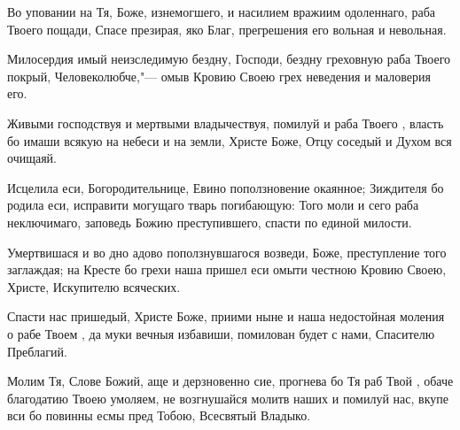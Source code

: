 \begin{mymulticols}





Во уповании на Тя, Боже, изнемогшего, и насилием вражиим одоленнаго, раба Твоего пощади, Спасе презирая, яко Благ, прегрешения его вольная и невольная.




Милосердия имый неизследимую бездну, Господи, бездну греховную раба Твоего покрый, Человеколюбче,"--- омыв Кровию Своею грех неведения и маловерия его.


\slava


Живыми господствуя и мертвыми владычествуя, помилуй и раба Твоего , власть бо имаши всякую на небеси и на земли, Христе Боже, Отцу соседый и Духом вся очищаяй.


\inyne


Исцелила еси, Богородительнице, Евино поползновение окаянное; Зиждителя бо родила еси, исправити могущаго тварь погибающую: Того моли и сего раба  неключимаго, заповедь Божию преступившего, спасти по единой милости. 








Умертвишася и во дно адово поползнувшагося возведи, Боже, преступление того заглаждая; на Кресте бо грехи наша пришел еси омыти честною Кровию Своею, Христе, Искупителю всяческих.




Спасти нас пришедый, Христе Боже, приими ныне и наша недостойная моления о рабе Твоем , да муки вечныя избавиши, помилован будет с нами, Спасителю Преблагий.


\slava


Молим Тя, Слове Божий, аще и дерзновенно сие, прогнева бо Тя раб Твой , обаче благодатию Твоею умоляем, не возгнушайся молитв наших и помилуй нас, вкупе вси бо повинны есмы пред Тобою, Всесвятый Владыко.



\end{mymulticols}
